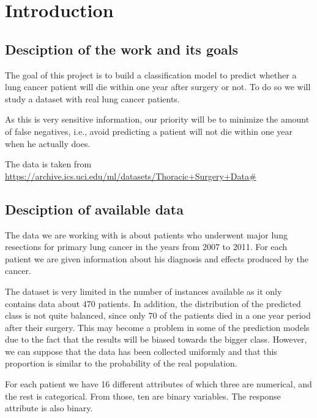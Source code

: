 \section{Introduction}

\subsection{Desciption of the work and its goals}

The goal of this project is to build a classification model to predict whether
a lung cancer patient will die within one year after surgery or not. To do so
we will study a dataset with real lung cancer patients.

As this is very sensitive information, our priority will be to minimize the
amount of false negatives, i.e., avoid predicting a patient will not die within
one year when he actually does.

The data is taken from
\url{https://archive.ics.uci.edu/ml/datasets/Thoracic+Surgery+Data#}
\cite{zieba2013boosted}

\subsection{Desciption of available data}

The data we are working with is about patients who underwent major lung
resections for primary lung cancer in the years from 2007 to 2011. For each
patient we are given information about his diagnosis and effects produced
by the cancer.

The dataset is very limited in the number of instances available as it only contains
data about 470 patients. In addition, the distribution of the predicted class is not quite
balanced,
since only 70 of the patients died in a one year period after their surgery. This may
become a problem in some of the prediction models due to the fact that the results
will be biased towards the bigger class. However, we can suppose that the data has been
collected uniformly and that this proportion is similar to the probability of the real population.

For each patient we have 16 different attributes of which three are numerical, and
the rest is categorical. From those, ten are binary variables. The response attribute is
also binary.

